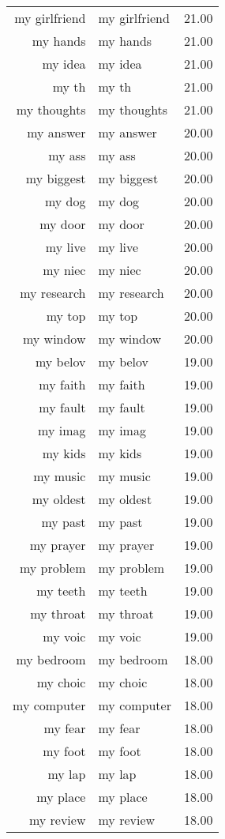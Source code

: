 \begin{table}[ht]
\begin{tabular}{rlr}
  my girlfriend & my girlfriend & 21.00 \\ 
  my hands & my hands & 21.00 \\ 
  my idea & my idea & 21.00 \\ 
  my th & my th & 21.00 \\ 
  my thoughts & my thoughts & 21.00 \\ 
  my answer & my answer & 20.00 \\ 
  my ass & my ass & 20.00 \\ 
  my biggest & my biggest & 20.00 \\ 
  my dog & my dog & 20.00 \\ 
  my door & my door & 20.00 \\ 
  my live & my live & 20.00 \\ 
  my niec & my niec & 20.00 \\ 
  my research & my research & 20.00 \\ 
  my top & my top & 20.00 \\ 
  my window & my window & 20.00 \\ 
  my belov & my belov & 19.00 \\ 
  my faith & my faith & 19.00 \\ 
  my fault & my fault & 19.00 \\ 
  my imag & my imag & 19.00 \\ 
  my kids & my kids & 19.00 \\ 
  my music & my music & 19.00 \\ 
  my oldest & my oldest & 19.00 \\ 
  my past & my past & 19.00 \\ 
  my prayer & my prayer & 19.00 \\ 
  my problem & my problem & 19.00 \\ 
  my teeth & my teeth & 19.00 \\ 
  my throat & my throat & 19.00 \\ 
  my voic & my voic & 19.00 \\ 
  my bedroom & my bedroom & 18.00 \\ 
  my choic & my choic & 18.00 \\ 
  my computer & my computer & 18.00 \\ 
  my fear & my fear & 18.00 \\ 
  my foot & my foot & 18.00 \\ 
  my lap & my lap & 18.00 \\ 
  my place & my place & 18.00 \\ 
  my review & my review & 18.00 \\ 

\end{tabular}
\end{table}
